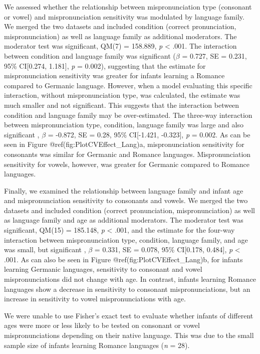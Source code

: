 \documentclass[man]{apa6}
\begin{document}
We assessed whether the relationship between mispronunciation type (consonant or vowel) and mispronunciation sensitivity was modulated by language family. We merged the two datasets and included condition (correct pronunciation, mispronunciation) as well as language family as additional moderators. The moderator test was significant, QM(7) = 158.889, \emph{p} \textless{} .001. The interaction between condition and language family was significant (\(\beta\) = 0.727, SE = 0.231, 95\% CI{[}0.274, 1.181{]}, \emph{p} = 0.002), suggesting that the estimate for mispronunciation sensitivity was greater for infants learning a Romance compared to Germanic language. However, when a model evaluating this specific interaction, without mispronunciation type, was calculated, the estimate was much smaller and not significant. This suggests that the interaction between condition and language family may be over-estimated. The three-way interaction between mispronunciation type, condition, language family was large and also significant , \(\beta\) = -0.872, SE = 0.28, 95\% CI{[}-1.421, -0.323{]}, \emph{p} = 0.002. As can be seen in Figure @ref(fig:PlotCVEffect\_Lang)a, mispronunciation sensitivity for consonants was similar for Germanic and Romance languages. Mispronunciation sensitivity for vowels, however, was greater for Germanic compared to Romance languages.

Finally, we examined the relationship between language family and infant age and mispronunciation sensitivity to consonants and vowels. We merged the two datasets and included condition (correct pronunciation, mispronunciation) as well as language family and age as additional moderators. The moderator test was significant, QM(15) = 185.148, \emph{p} \textless{} .001, and the estimate for the four-way interaction between mispronunciation type, condition, language family, and age was small, but significant , \(\beta\) = 0.331, SE = 0.078, 95\% CI{[}0.178, 0.484{]}, \emph{p} \textless{} .001. As can also be seen in Figure @ref(fig:PlotCVEffect\_Lang)b, for infants learning Germanic languages, sensitivity to consonant and vowel mispronunciations did not change with age. In contrast, infants learning Romance languages show a decrease in sensitivity to consonant mispronunciations, but an increase in sensitivity to vowel mispronunciations with age.

We were unable to use Fisher's exact test to evaluate whether infants of different ages were more or less likely to be tested on consonant or vowel mispronunciations depending on their native language. This was due to the small sample size of infants learning Romance languages (\emph{n} = 28).
\end{document}
